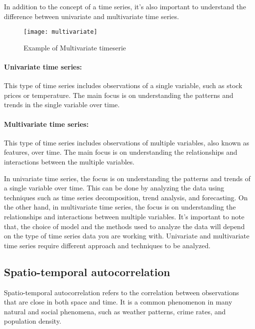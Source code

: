 In addition to the concept of a time series, it's also important to understand the difference between univariate and multivariate time series.
\begin{figure}[H]
  \centering
  \texttt{[image: multivariate]}
  \caption{Example of Multivariate timeserie \cite{mltech}}
\end{figure}

\paragraph{Univariate time series:} This type of time series includes observations of a single variable, such as stock prices or temperature. The main focus is on understanding the patterns and trends in the single variable over time.
\paragraph{Multivariate time series:} This type of time series includes observations of multiple variables, also known as features, over time. The main focus is on understanding the relationships and interactions between the multiple variables.

In univariate time series, the focus is on understanding the patterns and trends of a single variable over time. This can be done by analyzing the data using techniques such as time series decomposition, trend analysis, and forecasting.
On the other hand, in multivariate time series, the focus is on understanding the relationships and interactions between multiple variables. 
It's important to note that, the choice of model and the methods used to analyze the data will depend on the type of time series data you are working with. Univariate and multivariate time series require different approach and techniques to be analyzed.

\subsection{Spatio-temporal autocorrelation}
Spatio-temporal autocorrelation \cite{doi:10.1080/10095020.2019.1643609} refers to the correlation between observations that are close in both space and time. It is a common phenomenon in many natural and social phenomena, such as weather patterns, crime rates, and population density.

